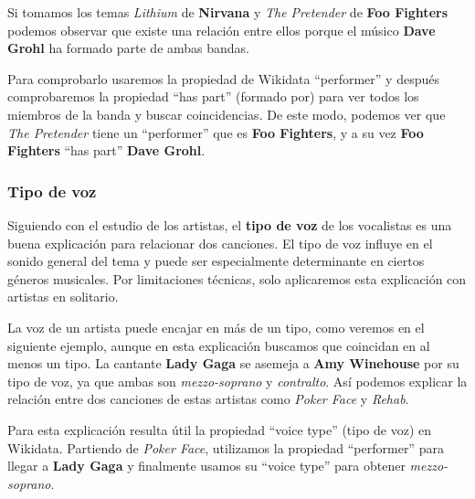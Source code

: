 Si tomamos los temas \textit{Lithium} de \textbf{Nirvana} y \textit{The Pretender} de \textbf{Foo Fighters} podemos observar que existe una relación entre ellos porque el músico \textbf{Dave Grohl} ha formado parte de ambas bandas.

Para comprobarlo usaremos la propiedad de Wikidata ``performer'' y después comprobaremos la propiedad ``has part'' (formado por) para ver todos los miembros de la banda y buscar coincidencias. De este modo, podemos ver que \textit{The Pretender} tiene un ``performer'' que es \textbf{Foo Fighters}, y a su vez \textbf{Foo Fighters} ``has part'' \textbf{Dave Grohl}.

\subsubsection*{Tipo de voz}

Siguiendo con el estudio de los artistas, el \textbf{tipo de voz} de los vocalistas es una buena explicación para relacionar dos canciones. El tipo de voz influye en el sonido general del tema y puede ser especialmente determinante en ciertos géneros musicales. Por limitaciones técnicas, solo aplicaremos esta explicación con artistas en solitario.

La voz de un artista puede encajar en más de un tipo, como veremos en el siguiente ejemplo, aunque en esta explicación buscamos que coincidan en al menos un tipo. La cantante \textbf{Lady Gaga} se asemeja a \textbf{Amy Winehouse} por su tipo de voz, ya que ambas son \textit{mezzo-soprano} y \textit{contralto}. Así podemos explicar la relación entre dos canciones de estas artistas como \textit{Poker Face} y \textit{Rehab}.

Para esta explicación resulta útil la propiedad ``voice type'' (tipo de voz) en Wikidata. Partiendo de \textit{Poker Face}, utilizamos la propiedad ``performer'' para llegar a \textbf{Lady Gaga} y finalmente usamos su ``voice type'' para obtener \textit{mezzo-soprano}.